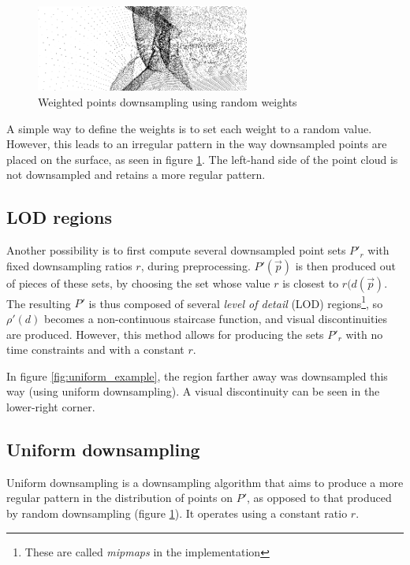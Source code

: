 \documentclass[a4paper,10pt,abstracton,notitlepage]{scrreprt}
\begin{document}
\begin{figure}
\includegraphics[width=7cm,frame]{random_weights_inv.png}
\caption{Weighted points downsampling using random weights}
\label{fig:random_weights}
\end{figure}
A simple way to define the weights is to set each weight to a random value. However, this leads to an irregular pattern in the way downsampled points are placed on the surface, as seen in figure \ref{fig:random_weights}. The left-hand side of the point cloud is not downsampled and retains a more regular pattern.

\subsection{LOD regions}
Another possibility is to first compute several downsampled point sets $P'_{r}$ with fixed downsampling ratios $r$, during preprocessing. $P'(\overrightarrow{p})$ is then produced out of pieces of these sets, by choosing the set whose value $r$ is closest to $r(d(\overrightarrow{p})$. The resulting $P'$ is thus composed of several \emph{level of detail} (LOD) regions\footnote{These are called \emph{mipmaps} in the implementation}, so $\rho'(d)$ becomes a non-continuous staircase function, and visual discontinuities are produced. However, this method allows for producing the sets $P'_{r}$ with no time constraints and with a constant $r$.

In figure \ref{fig:uniform_example}, the region farther away was downsampled this way (using uniform downsampling). A visual discontinuity can be seen in the lower-right corner.

\subsection{Uniform downsampling}
Uniform downsampling is a downsampling algorithm that aims to produce a more regular pattern in the distribution of points on $P'$, as opposed to that produced by random downsampling (figure \ref{fig:random_weights}). It operates using a constant ratio $r$.
\end{document}

